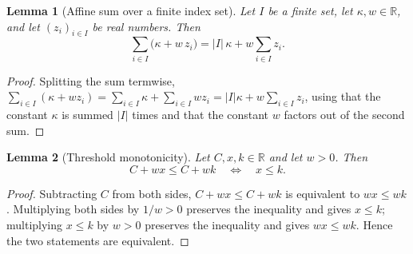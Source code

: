 \documentclass[11pt]{article}
\newtheorem{alemma}{Lemma}[section] %
\begin{document}
\begin{alemma}[Affine sum over a finite index set]\label{alem:affinesum}
Let $I$ be a finite set, let $\kappa,w\in\mathbb{R}$, and let $(z_i)_{i\in I}$ be real numbers.  Then
\begin{equation}
  \sum_{i\in I}\bigl(\kappa+w\,z_i\bigr)
  =|I|\,\kappa+w\sum_{i\in I}z_i .
\end{equation}
\end{alemma}

\begin{proof}
Splitting the sum termwise, $\sum_{i\in I}(\kappa+wz_i)=\sum_{i\in I}\kappa+\sum_{i\in I}wz_i=|I|\kappa+w\sum_{i\in I}z_i$, using that the constant $\kappa$ is summed $|I|$ times and that the constant $w$ factors out of the second sum.
\end{proof}

\begin{alemma}[Threshold monotonicity]\label{alem:threshold}
Let $C,x,k\in\mathbb{R}$ and let $w>0$.  Then
\begin{equation}
  C+wx\le C+wk
  \quad\Longleftrightarrow\quad
  x\le k.
\end{equation}
\end{alemma}

\begin{proof}
Subtracting $C$ from both sides, $C+wx\le C+wk$ is equivalent to $wx\le wk$.  Multiplying both sides by $1/w>0$ preserves the inequality and gives $x\le k$; multiplying $x\le k$ by $w>0$ preserves the inequality and gives $wx\le wk$.  Hence the two statements are equivalent.
\end{proof}
\end{document}
